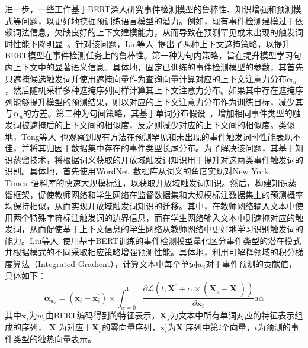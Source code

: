 进一步，一些工作基于BERT深入研究事件检测模型的鲁棒性、知识增强和预测模式等问题，以更好地挖掘预训练语言模型的潜力。例如，现有事件检测建模过于依赖词法信息，欠缺良好的上下文建模能力，从而导致在预测罕见或未出现的触发词时性能下降明显~\cite{lu2019distilling}。针对该问题，Liu等人~\cite{liu2020does}提出了两种上下文遮掩策略，以提升BERT模型在事件检测任务上的鲁棒性。第一种为句内策略，旨在提升模型学习句内上下文中的显著语义信息。具体地，固定已训练的事件检测模型的参数，其首先只遮掩候选触发词并使用遮掩向量作为查询向量计算对应的上下文注意力分布$\boldsymbol{\alpha}_{u}$，然后随机采样多种遮掩序列同样计算其上下文注意力分布。如果其中存在遮掩序列能够提升模型的预测结果，则以对应的上下文注意力分布作为训练目标，减少其与$\boldsymbol{\alpha}_{u}$的方差。第二种为句间策略，其基于单词分布假设~\cite{harris1970distributional}，增加相同事件类型的触发词被遮掩后的上下文间的相似度，反之则减少对应的上下文间的相似度。类似地，Tong等人~\cite{tong2020improving}也观察到现有方法在预测罕见和未出现的事件触发词时性能表现不佳，并将其归因于数据集中存在的事件类型长尾分布。为了解决该问题，其基于知识蒸馏技术，将根据词义获取的开放域触发词知识用于提升对这两类事件触发词的识别。具体地，首先使用WordNet~\cite{miller1990introduction}数据库从词义的角度实现对New York Times~\cite{sandhaus2008new}语料库的快速大规模标注，以获取开放域触发词知识。然后，构建知识蒸馏框架，促使教师网络和学生网络在监督数据集和大规模标注数据集上的预测概率均保持相似，从而实现开放域触发词知识的迁移。其中，在教师网络输入文本中使用两个特殊字符标注触发词的边界信息，而在学生网络输入文本中则遮掩对应的触发词，从而促使基于上下文信息的学生网络从教师网络中更好地学习识别触发词的能力。Liu等人~\cite{liu2022saliency}使用基于BERT训练的事件检测模型量化区分事件类型的潜在模式并根据模式的不同采取相应策略增强预测性能。具体地，利用可解释领域的积分梯度算法（Integrated Gradient）\cite{sundararajan2017axiomatic}，计算文本中每个单词$w_{i}$对于事件预测的贡献值，具体如下：
\begin{equation}
\boldsymbol{\alpha}_{w_i}=\left(\boldsymbol{x}_i-\boldsymbol{x}_i^{\prime}\right) \times \int_{\alpha=0}^1 \frac{\partial \mathcal{L}\left(t ; \boldsymbol{X}^{\prime}+\alpha \times\left(\boldsymbol{X}_s-\boldsymbol{X}^{\prime}\right)\right)}{\partial \boldsymbol{x}_i} d \alpha
\end{equation}
其中$\boldsymbol{x}_i$为$w_{i}$由BERT编码得到的特征表示，$\boldsymbol{X}_s$为文本中所有单词对应的特征表示组成的序列，
$\boldsymbol{X}^{\prime}$为对应于$\boldsymbol{X}_s$的零向量序列，$\boldsymbol{x}_i^{\prime}$为$\boldsymbol{X}^{\prime}$序列中第$i$个向量，$t$为预测的事件类型的独热向量表示。


